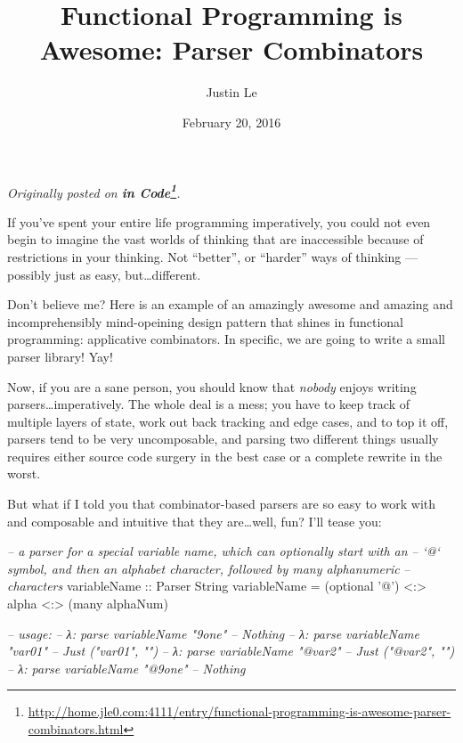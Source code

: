 \documentclass[]{article}
\title{Functional Programming is Awesome: Parser Combinators}
\author{Justin Le}
\date{February 20, 2016}
\newenvironment{Shaded}{}{}
\newcommand{\DataTypeTok}[1]{\textcolor[rgb]{0.56,0.13,0.00}{{#1}}}
\newcommand{\CharTok}[1]{\textcolor[rgb]{0.25,0.44,0.63}{{#1}}}
\newcommand{\CommentTok}[1]{\textcolor[rgb]{0.38,0.63,0.69}{\textit{{#1}}}}
\newcommand{\OtherTok}[1]{\textcolor[rgb]{0.00,0.44,0.13}{{#1}}}
\newcommand{\FunctionTok}[1]{\textcolor[rgb]{0.02,0.16,0.49}{{#1}}}
\newcommand{\NormalTok}[1]{{#1}}
\renewcommand{\href}[2]{#2\footnote{\url{#1}}}
\begin{document}
\maketitle

\emph{Originally posted on
\textbf{\href{http://home.jle0.com:4111/entry/functional-programming-is-awesome-parser-combinators.html}{in
Code}}.}

If you've spent your entire life programming imperatively, you could not even begin to imagine the
vast worlds of thinking that are inaccessible because of restrictions in your thinking. Not
``better'', or ``harder'' ways of thinking --- possibly just as easy, but\ldots{}different.

Don't believe me? Here is an example of an amazingly awesome and amazing and incomprehensibly
mind-opeining design pattern that shines in functional programming: applicative combinators. In
specific, we are going to write a small parser library! Yay!

Now, if you are a sane person, you should know that \emph{nobody} enjoys writing
parsers\ldots{}imperatively. The whole deal is a mess; you have to keep track of multiple layers of
state, work out back tracking and edge cases, and to top it off, parsers tend to be very
uncomposable, and parsing two different things usually requires either source code surgery in the
best case or a complete rewrite in the worst.

But what if I told you that combinator-based parsers are so easy to work with and composable and
intuitive that they are\ldots{}well, fun? I'll tease you:

\begin{Shaded}
\begin{Highlighting}[]
\CommentTok{-- a parser for a special variable name, which can optionally start with an}
\CommentTok{-- `@` symbol, and then an alphabet character, followed by many alphanumeric}
\CommentTok{-- characters}
\OtherTok{variableName ::} \DataTypeTok{Parser} \DataTypeTok{String}
\NormalTok{variableName }\FunctionTok{=} \NormalTok{(optional }\CharTok{'@'}\NormalTok{) }\FunctionTok{<:>} \NormalTok{alpha }\FunctionTok{<:>} \NormalTok{(many alphaNum)}

\CommentTok{-- usage:}
\CommentTok{-- λ: parse variableName "9one"}
\CommentTok{-- Nothing}
\CommentTok{-- λ: parse variableName "var01"}
\CommentTok{-- Just ("var01", "")}
\CommentTok{-- λ: parse variableName "@var2"}
\CommentTok{-- Just ("@var2", "")}
\CommentTok{-- λ: parse variableName "@9one"}
\CommentTok{-- Nothing}
\end{Highlighting}
\end{Shaded}
\end{document}
